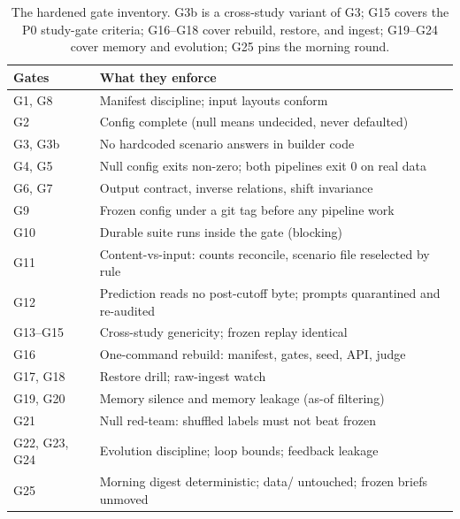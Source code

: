 \documentclass[11pt]{article}
\begin{document}
\begin{table}[t]
\centering
\caption{The hardened gate inventory. G3b is a cross-study variant of G3;
G15 covers the P0 study-gate criteria; G16--G18 cover rebuild, restore, and
ingest; G19--G24 cover memory and evolution; G25 pins the morning round.}
\label{tab:gates}
\footnotesize
\begin{tabular}{ll}
\toprule
Gates & What they enforce \\
\midrule
G1, G8 & Manifest discipline; input layouts conform \\
G2 & Config complete (null means undecided, never defaulted) \\
G3, G3b & No hardcoded scenario answers in builder code \\
G4, G5 & Null config exits non-zero; both pipelines exit 0 on real data \\
G6, G7 & Output contract, inverse relations, shift invariance \\
G9 & Frozen config under a git tag before any pipeline work \\
G10 & Durable suite runs inside the gate (blocking) \\
G11 & Content-vs-input: counts reconcile, scenario file reselected by rule \\
G12 & Prediction reads no post-cutoff byte; prompts quarantined and re-audited \\
G13--G15 & Cross-study genericity; frozen replay identical \\
G16 & One-command rebuild: manifest, gates, seed, API, judge \\
G17, G18 & Restore drill; raw-ingest watch \\
G19, G20 & Memory silence and memory leakage (as-of filtering) \\
G21 & Null red-team: shuffled labels must not beat frozen \\
G22, G23, G24 & Evolution discipline; loop bounds; feedback leakage \\
G25 & Morning digest deterministic; data/ untouched; frozen briefs unmoved \\
\bottomrule
\end{tabular}
\normalsize
\end{table}
\end{document}
